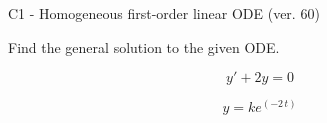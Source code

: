 \begin{exercise}
  \begin{exerciseTitle}C1 - Homogeneous first-order linear ODE (ver. 60)\end{exerciseTitle}
  \begin{exerciseStatement}
    
Find the general solution to the given ODE.

    
\[y'+2y=0\]

  \end{exerciseStatement}
  \begin{exerciseAnswer}
    
\[y= k e^{\left(-2 \, t\right)}\]

  \end{exerciseAnswer}
\end{exercise}